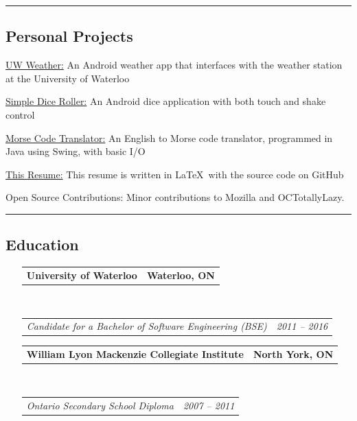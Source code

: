 \documentclass[10pt,letterpaper]{article}
\makeatletter
\newenvironment{indentsection}[1]%
{\begin{list}{}%
	{\setlength{\leftmargin}{#1}}%
	\item[]%
}
{\end{list}}
\newcommand{\headerrow}[2]
{\begin{tabular*}{\linewidth}{l@{\extracolsep{\fill}}r}
	#1 &
	#2 \\
\end{tabular*}}
\makeatother
\begin{document}
\hrule
\vspace{-0.4em}
\subsection*{Personal Projects}
	\begin{indentsection}{\parindent}
	\begin{description*}
		\item[\href{https://github.com/Kapin/Waterloo-Weather}{UW Weather:}] An Android weather app that interfaces with the weather station at the University of Waterloo
		\item[\href{https://github.com/Kapin/Dice-Roller}{Simple Dice Roller:}] An Android dice application with both touch and shake control	
		\item[\href{https://github.com/Kapin/Morse-Code-Translator}{Morse Code Translator:}] An English to Morse code translator, programmed in Java using Swing, with basic I/O
		\item[\href{https://github.com/kapin/resume}{This Resume:}] This resume is written in \LaTeX \ with the source code on GitHub
		\item[Open Source Contributions:] Minor contributions to Mozilla and OCTotallyLazy.
	\end{description*}
	\end{indentsection}




\hrule
\vspace{-0.4em}
\subsection*{Education}

\begin{itemize}[leftmargin=*]
	\parskip=0.1em

	\item[] 
	\headerrow
		{\textbf{University of Waterloo}}
		{\textbf{Waterloo, ON}}
	\\
	\headerrow
		{\emph{Candidate for a Bachelor of Software Engineering (BSE)}}
		{\emph{2011 -- 2016}}
		
	\item[] 
	\headerrow
		{\textbf{William Lyon Mackenzie Collegiate Institute}}
		{\textbf{North York, ON}}
	\\
	\headerrow
		{\emph{Ontario Secondary School Diploma}}
		{\emph{2007 -- 2011}}

\end{itemize}
\end{document}
